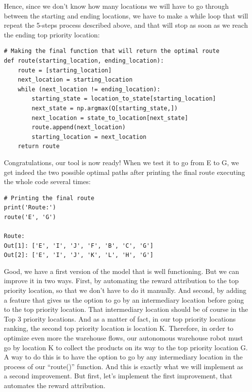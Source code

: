 \documentclass[]{book}
\begin{document}
Hence, since we don't know how many locations we will have to go through between the starting and ending locations, we have to make a while loop that will repeat the 5-steps process described above, and that will stop as soon as we reach the ending top priority location:

\begin{lstlisting}
# Making the final function that will return the optimal route
def route(starting_location, ending_location):
    route = [starting_location]
    next_location = starting_location
    while (next_location != ending_location):
        starting_state = location_to_state[starting_location]
        next_state = np.argmax(Q[starting_state,])
        next_location = state_to_location[next_state]
        route.append(next_location)
        starting_location = next_location
    return route
\end{lstlisting}

Congratulations, our tool is now ready! When we test it to go from E to G, we get indeed the two possible optimal paths after printing the final route executing the whole code several times:

\begin{lstlisting}
# Printing the final route
print('Route:')
route('E', 'G')

Route:
Out[1]: ['E', 'I', 'J', 'F', 'B', 'C', 'G']
Out[2]: ['E', 'I', 'J', 'K', 'L', 'H', 'G']
\end{lstlisting}

Good, we have a first version of the model that is well functioning. But we can improve it in two ways. First, by automating the reward attribution to the top priority location, so that we don't have to do it manually. And second, by adding a feature that gives us the option to go by an intermediary location before going to the top priority location. That intermediary location should be of course in the Top 3 priority locations. And as a matter of fact, in our top priority locations ranking, the second top priority location is location K. Therefore, in order to optimize even more the warehouse flows, our autonomous warehouse robot must go by location K to collect the products on its way to the top priority location G. A way to do this is to have the option to go by any intermediary location in the process of our ``route()'' function. And this is exactly what we will implement as a second improvement. But first, let's implement the first improvement, that automates the reward attribution.
\end{document}
